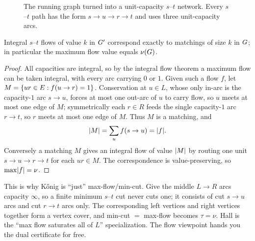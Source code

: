 \begin{figure}[H]
\centering
{}
\caption{The running graph turned into a unit-capacity $s$--$t$ network. Every
$s$--$t$ path has the form $s\to u\to r\to t$ and uses three unit-capacity arcs.}
\label{ch15:fig-flow}
\end{figure}

\begin{theorem}[Matching $=$ integral max flow]
\label{ch15:thm-flow}
Integral $s$--$t$ flows of value $k$ in $G'$ correspond exactly to matchings
of size $k$ in $G$; in particular the maximum flow value equals $\nu(G)$.
\end{theorem}

\begin{proof}
All capacities are integral, so by the integral flow theorem a maximum flow can
be taken integral, with every arc carrying $0$ or $1$. Given such a flow $f$, let
$M=\{ur\in E: f(u\to r)=1\}$. Conservation at $u\in L$, whose only in-arc is the
capacity-$1$ arc $s\to u$, forces at most one out-arc of $u$ to carry flow, so
$u$ meets at most one edge of $M$; symmetrically each $r\in R$ feeds the single
capacity-$1$ arc $r\to t$, so $r$ meets at most one edge of $M$. Thus $M$ is a
matching, and
\[
\lvert M\rvert=\sum_u f(s\to u)=\lvert f\rvert.
\]
Conversely a matching $M$ gives
an integral flow of value $\lvert M\rvert$ by routing one unit $s\to u\to r\to t$ for
each $ur\in M$. The correspondence is value-preserving, so $\max\lvert f\rvert=\nu$.
\end{proof}

\begin{whybox}
This is why K\H{o}nig is ``just'' max-flow/min-cut. Give the middle $L\to R$ arcs
capacity $\infty$, so a finite minimum $s$--$t$ cut never cuts one; it consists of
cut $s\to u$ arcs and cut $r\to t$ arcs only. The corresponding left vertices and
right vertices together form a vertex cover, and min-cut $=$ max-flow becomes
$\tau=\nu$. Hall is the ``max flow saturates all of $L$'' specialization. The flow
viewpoint hands you the dual certificate for free.
\end{whybox}

